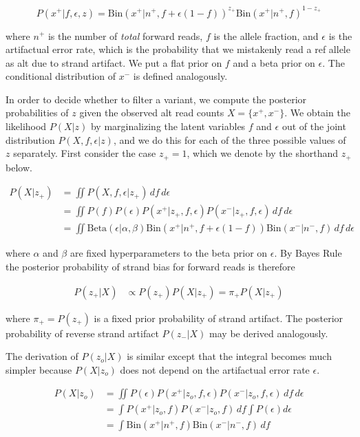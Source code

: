 \documentclass[nofootinbib,amssymb,amsmath]{revtex4}
\begin{document}
\begin{equation}
P(x^+ | f, \epsilon, z) = \text{Bin} (x^+ | n^+, f + \epsilon(1-f))^{z_+} \text{Bin} (x^+ | n^+, f)^{1 - z_+}
\end{equation}

where $n^+$ is the number of \emph{total} forward reads, $f$ is the allele fraction, and $\epsilon$ is the artifactual error rate, which is the probability that we mistakenly read a ref allele as alt due to strand artifact. We put a flat prior on $f$ and a beta prior on $\epsilon$. The conditional distribution of $x^-$ is defined analogously.

In order to decide whether to filter a variant, we compute the posterior probabilities of $z$ given the observed alt read counts $X = \{ x^+, x^- \}$.  We obtain the likelihood $P(X | z)$ by marginalizing the latent variables $f$ and $\epsilon$ out of the joint distribution $P(X, f, \epsilon | z)$, and we do this for each of the three possible values of $z$ separately. First consider the case $z_+ = 1$, which we denote by the shorthand $z_+$ below.

\begin{align}
P(X | z_+ )  &= \iint  P(X, f, \epsilon | z_+) \,df\,d\epsilon \nonumber \\
		  &= \iint  P(f) P(\epsilon) P(x^+ | z_+, f, \epsilon) P(x^- | z_+, f, \epsilon) \,df\,d\epsilon \nonumber \\
		  &= \iint \mathrm{Beta}(\epsilon|\alpha, \beta) \mathrm{Bin}(x^+ | n^+, f + \epsilon(1-f)) \mathrm{Bin}(x^- | n^-, f) \,df\,d\epsilon
\end{align}

where $\alpha$ and $\beta$ are fixed hyperparameters to the beta prior on $\epsilon$. By Bayes Rule the posterior probability of strand bias for forward reads is therefore

\begin{align}
P(z_+ | X) & \propto P(z_+) P(X | z_+) = \pi_+ P(X | z_+) 
\end{align}

where $\pi_+ = P(z_+)$ is a fixed prior probability of strand artifact. The posterior probability of reverse strand artifact $P(z_- | X)$ may be derived analogously. 

The derivation of $P(z_o|X)$ is similar except that the integral becomes much simpler because $P(X|z_o)$ does not depend on the artifactual error rate $\epsilon$.

\begin{align}
P(X | z_o)  &= \iint P(\epsilon) P(x^+ | z_o, f, \epsilon) P(x^- | z_o, f, \epsilon) \,df\,d\epsilon \nonumber \\
	 	 &= \int  P(x^+ | z_o, f) P(x^- | z_o, f) \,df \int  P(\epsilon) d\epsilon \nonumber \\
		 &= \int  \mathrm{Bin}(x^+ | n^+, f) \mathrm{Bin}(x^- | n^-, f) \,df
\end{align}
\end{document}
